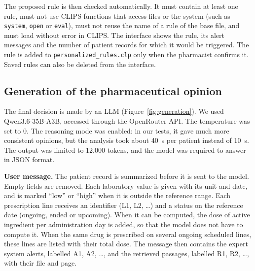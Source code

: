 \documentclass{article}
\begin{document}
The proposed rule is then checked automatically. It must contain at least one rule, must not use CLIPS functions that access files or the system (such as \texttt{system}, \texttt{open} or \texttt{eval}), must not reuse the name of a rule of the base file, and must load without error in CLIPS. The interface shows the rule, its alert messages and the number of patient records for which it would be triggered. The rule is added to \texttt{personalized\_rules.clp} only when the pharmacist confirms it. Saved rules can also be deleted from the interface.

\subsection{Generation of the pharmaceutical opinion}

The final decision is made by an LLM (Figure~\ref{fig:generation}). We used Qwen3.6-35B-A3B, accessed through the OpenRouter API. The temperature was set to 0. The reasoning mode was enabled: in our tests, it gave much more consistent opinions, but the analysis took about 40~s per patient instead of 10~s. The output was limited to 12,000 tokens, and the model was required to answer in JSON format.

\textbf{User message.} The patient record is summarized before it is sent to the model. Empty fields are removed. Each laboratory value is given with its unit and date, and is marked ``low'' or ``high'' when it is outside the reference range. Each prescription line receives an identifier (L1, L2, \ldots) and a status on the reference date (ongoing, ended or upcoming). When it can be computed, the dose of active ingredient per administration day is added, so that the model does not have to compute it. When the same drug is prescribed on several ongoing scheduled lines, these lines are listed with their total dose. The message then contains the expert system alerts, labelled A1, A2, \ldots, and the retrieved passages, labelled R1, R2, \ldots, with their file and page.
\end{document}
